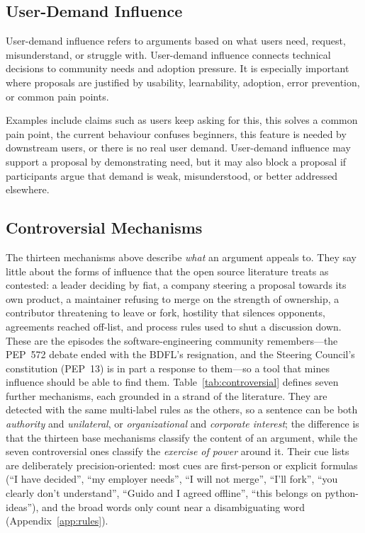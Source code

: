 \documentclass[sigconf,screen]{acmart}
\begin{document}
\subsection{User-Demand Influence}

User-demand influence refers to arguments based on what users need, request, misunderstand, or struggle with. User-demand influence connects technical decisions to community needs and adoption pressure. It is especially important where proposals are justified by usability, learnability, adoption, error prevention, or common pain points.

Examples include claims such as users keep asking for this, this solves a common pain point, the current behaviour confuses beginners, this feature is needed by downstream users, or there is no real user demand. User-demand influence may support a proposal by demonstrating need, but it may also block a proposal if participants argue that demand is weak, misunderstood, or better addressed elsewhere.

\subsection{Controversial Mechanisms}
\label{sec:controversial}

The thirteen mechanisms above describe \emph{what} an argument appeals to. They say little about the forms of influence that the open source literature treats as contested: a leader deciding by fiat, a company steering a proposal towards its own product, a maintainer refusing to merge on the strength of ownership, a contributor threatening to leave or fork, hostility that silences opponents, agreements reached off-list, and process rules used to shut a discussion down. These are the episodes the software-engineering community remembers---the PEP~572 debate ended with the BDFL's resignation, and the Steering Council's constitution (PEP~13) is in part a response to them---so a tool that mines influence should be able to find them. Table~\ref{tab:controversial} defines seven further mechanisms, each grounded in a strand of the literature. They are detected with the same multi-label rules as the others, so a sentence can be both \emph{authority} and \emph{unilateral}, or \emph{organizational} and \emph{corporate interest}; the difference is that the thirteen base mechanisms classify the content of an argument, while the seven controversial ones classify the \emph{exercise of power} around it. Their cue lists are deliberately precision-oriented: most cues are first-person or explicit formulas (``I have decided'', ``my employer needs'', ``I will not merge'', ``I'll fork'', ``you clearly don't understand'', ``Guido and I agreed offline'', ``this belongs on python-ideas''), and the broad words only count near a disambiguating word (Appendix~\ref{app:rules}).
\end{document}
